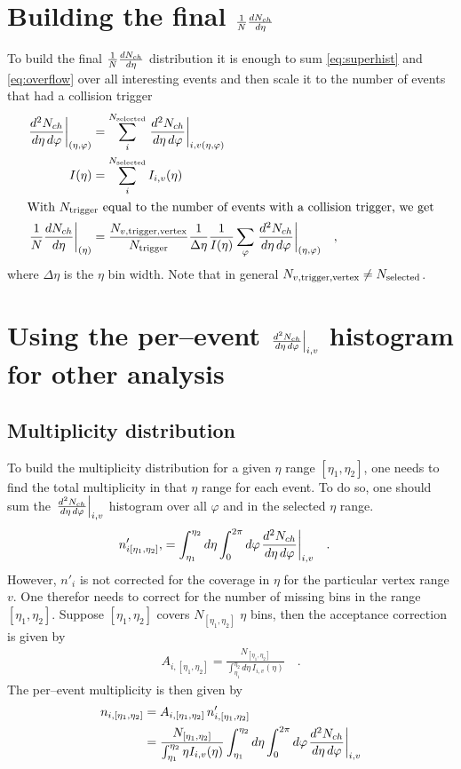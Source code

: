 \documentclass[11pt]{article}
\newcommand{\dndetadphi}[1][]{{\ensuremath%
    \ifx|#1|\else\left.\fi%
    \frac{d^2N_{ch}}{d\eta\,d\varphi}%
    \ifx|#1|\else\right|_{#1}\fi%
}}
\newcommand{\dndeta}[1][]{{\ensuremath%
    \ifx|#1|\else\left.\fi%
    \frac{1}{N}\frac{dN_{ch}}{d\eta}%
    \ifx|#1|\else\right|_{#1}\fi%
}}
\newcommand{\Nsel}{{\ensuremath N_{v,\text{trigger,vertex}}}}
\begin{document}
\section{Building the final $\dndeta$}

To build the final $\dndeta$ distribution it is enough to sum
\eqref{eq:superhist} and \eqref{eq:overflow} over all interesting
events and then scale it to the number of events that had a collision
trigger
\begin{align}
  \dndetadphi[(\eta,\varphi)] &= \sum_i^{N_{\text{selected}}}
  \dndetadphi[i,v(\eta,\varphi)]\\ 
  I(\eta) &= \sum_i^{N_{\text{selected}}}I_{i,v}(\eta)\\
  \intertext{With $N_{\text{trigger}}$ equal to the number of events with a
    collision trigger, we get}
  \dndeta[(\eta)] &=
  \frac{\Nsel{}}{N_{\text{trigger}}}\frac{1}{\Delta\eta}
  \frac{1}{I(\eta)}\sum_{\varphi}\dndetadphi[(\eta,\varphi)]\quad,
\end{align}
where $\Delta\eta$ is the $\eta$ bin width.  Note that in general
$\Nsel{}\ne N_{\text{selected}}$. 

\section{Using the per--event $\dndetadphi[i,v]$ histogram for other
  analysis} 

\subsection{Multiplicity distribution} 

To build the multiplicity distribution for a given $\eta$ range
$[\eta_1,\eta_2]$, one needs to find the total multiplicity in that
$\eta$ range for each event. To do so, one should sum the
$\dndetadphi[i,v]$ histogram over all $\varphi$ and in the selected
$\eta$ range.
\begin{align}
  n'_{i[\eta_1,\eta_2]}, &= \int_{\eta_1}^{\eta_2}d\eta\int_0^{2\pi}d\varphi
  \dndetadphi[i,v]\quad.\nonumber
\end{align}
However, $n'_i$ is not corrected for the coverage in $\eta$ for the
particular vertex range $v$.  One therefor needs to correct for the
number of missing bins in the range $[\eta_1,\eta_2]$.  Suppose
$[\eta_1,\eta_2]$ covers $N_{[\eta_1,\eta_2]}$ $\eta$ bins, then the acceptance
correction is given by 
\begin{align}
  A_{i,[\eta_1,\eta_2]} = \frac{N_{[\eta_1,\eta_2]}}{\int_{\eta_1}^{\eta_2}d\eta\,
    I_{i,v}(\eta)}\quad.\nonumber
\end{align}
The per--event multiplicity is then given by 
\begin{align}
  n_{i,[\eta_1,\eta_2]} &= A_{i,[\eta_1,\eta_2]}\,n'_{i,[\eta_1,\eta_2]}\nonumber\\
  &= \frac{N_{[\eta_1,\eta_2]}}{\int_{\eta_1}^{\eta_2}\eta
    I_{i,v}(\eta)} \int_{\eta_1}^{\eta_2}d\eta\int_0^{2\pi}d\varphi
  \dndetadphi[i,v]
  \label{eq:event_n}
\end{align}
\end{document}
